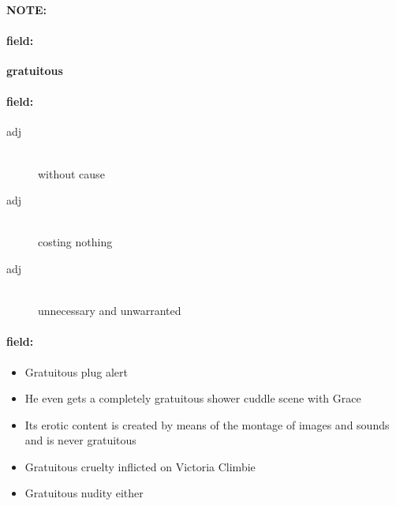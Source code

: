 \documentclass[12pt]{article}
\newenvironment{note}{\paragraph{NOTE:}}{}
\newenvironment{field}{\paragraph{field:}}{}
\begin{document}
\begin{note}
\begin{field}
\textbf{\large gratuitous}
\end{field}


\begin{field}
\begin{description}
\item[adj] \hfill \\ 
without cause

\item[adj] \hfill \\ 
costing nothing

\item[adj] \hfill \\ 
unnecessary and unwarranted

\end{description}
\end{field}

\begin{field}
\begin{itemize}
\item Gratuitous plug alert
\item He even gets a completely gratuitous shower cuddle scene with Grace
\item Its erotic content is created by means of the montage of images and sounds and is never gratuitous
\item Gratuitous cruelty inflicted on Victoria Climbie
\item Gratuitous nudity either
\end{itemize}
\end{field}
\end{note}
\end{document}
